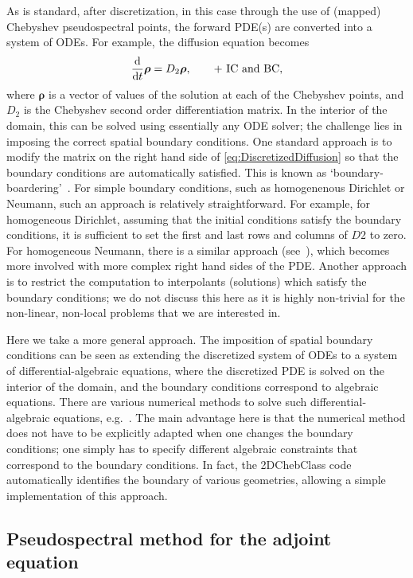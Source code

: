 As is standard, after discretization, in this case through the use of (mapped) Chebyshev pseudospectral points,
the forward PDE(s) are converted into a system of ODEs.  For example, the diffusion equation becomes
\begin{equation}
	\frac{{\rm d}}{{\rm d} t} \boldsymbol{\rho} = D_2 \boldsymbol{\rho}, \qquad \mbox{+ IC and BC},
	\label{eq:DiscretizedDiffusion}
\end{equation}
where $\boldsymbol{\rho}$ is a vector of values of the solution at each of the Chebyshev points, and $D_2$ is the
Chebyshev second order differentiation matrix.
In the interior of the domain, this can be solved using essentially
any ODE solver; the challenge lies in imposing the correct spatial boundary conditions.  One standard approach
is to modify the matrix on the right hand side of \eqref{eq:DiscretizedDiffusion} so that the boundary conditions
are automatically satisfied.  This is known as `boundary-boardering'~\cite{B01}.  For simple boundary conditions, such as
homogenenous Dirichlet or Neumann, such an approach is relatively straightforward.  For example, for homogeneous Dirichlet,
assuming that the initial conditions satisfy the boundary conditions, it is sufficient to set the first and last rows
and columns of $D2$ to zero.  For homogeneous Neumann, there is a similar approach (see~\cite{T00}), which becomes
more involved with more complex right hand sides of the PDE.  Another approach is to restrict the computation
to interpolants (solutions) which satisfy the boundary conditions; we do not discuss this here as it is highly
non-trivial for the non-linear, non-local problems that we are interested in.

Here we take a more general approach.  The imposition of spatial boundary conditions can be seen as 
extending the discretized system of ODEs to a system of differential-algebraic equations, where the discretized
PDE is solved on the interior of the domain, and the boundary conditions correspond to algebraic equations.
There are various numerical methods to solve such differential-algebraic equations, e.g.~\cite{SEK99}.
The main advantage here is that the numerical method does not have to be explicitly adapted when 
one changes the boundary conditions; one simply has to specify different algebraic constraints that correspond
to the boundary conditions.  In fact, the 2DChebClass code automatically identifies the boundary of various
geometries, allowing a simple implementation of this approach.

\subsection{Pseudospectral method for the adjoint equation}\label{sec:Method_PseudospectralPDECO}

